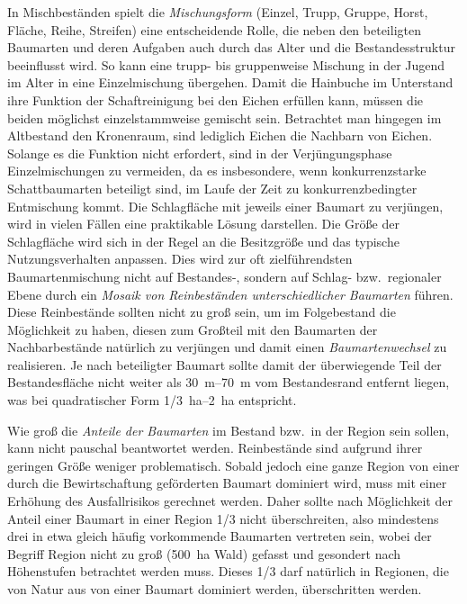 \documentclass[twocolumn, paper=a4, fontsize=10pt, bibliography=totoc, index=totoc]{scrartcl}
\begin{document}
In Mischbeständen spielt die \emph{Mischungsform} (Einzel, Trupp,
Gruppe, Horst, Fläche, Reihe, Streifen) eine entscheidende Rolle, die
neben den beteiligten Baumarten und deren Aufgaben auch durch das
Alter und die Bestandesstruktur beeinflusst wird. So kann eine trupp-
bis gruppenweise Mischung in der Jugend im Alter in eine
Einzelmischung übergehen. Damit die Hainbuche im Unterstand ihre
Funktion der Schaftreinigung bei den Eichen erfüllen kann, müssen
die beiden möglichst einzelstammweise gemischt sein. Betrachtet man
hingegen im Altbestand den Kronenraum, sind lediglich Eichen die
Nachbarn von Eichen. Solange es die Funktion nicht erfordert, sind in
der Verjüngungsphase Einzelmischungen zu vermeiden, da es insbesondere, wenn konkurrenzstarke Schattbaumarten beteiligt sind, im Laufe der Zeit
zu konkurrenzbedingter Entmischung kommt. Die Schlagfläche mit jeweils
einer Baumart zu verjüngen, wird in vielen Fällen eine praktikable
Lösung darstellen. Die Größe der Schlagfläche wird sich in der Regel
an die Besitzgröße und das typische Nutzungsverhalten anpassen. Dies
wird zur oft zielführendsten Baumartenmischung nicht auf Bestandes-,
sondern auf Schlag- bzw.\ regionaler Ebene durch ein \emph{Mosaik von Reinbeständen
unterschiedlicher Baumarten} führen. Diese Reinbestände sollten
nicht zu groß sein, um im Folgebestand die Möglichkeit zu haben,
diesen zum Großteil mit den Baumarten der Nachbarbestände natürlich zu
verjüngen und damit einen \emph{Baumartenwechsel} zu realisieren. Je
nach beteiligter Baumart sollte damit der überwiegende Teil der
Bestandesfläche nicht weiter als \qtyrange{30}{70}{\metre} vom Bestandesrand entfernt
liegen, was bei quadratischer Form \qtyrange[parse-numbers=false]{1/3}{2}{\hectare} entspricht.

Wie groß die \emph{Anteile der Baumarten} im Bestand bzw.\ in der
Region sein sollen, kann nicht pauschal beantwortet
werden. Reinbestände sind aufgrund ihrer geringen Größe weniger
problematisch. Sobald jedoch eine ganze Region von einer durch die
Bewirtschaftung geförderten Baumart dominiert wird, muss mit einer
Erhöhung des Ausfallrisikos gerechnet werden. Daher sollte nach
Möglichkeit der Anteil einer Baumart in einer Region 1/3 nicht
überschreiten, also mindestens drei in etwa gleich häufig vorkommende
Baumarten vertreten sein, wobei der Begriff Region nicht zu groß (\qty{500}{\hectare} Wald) gefasst und gesondert nach Höhenstufen betrachtet werden
muss. Dieses 1/3 darf natürlich in Regionen, die von Natur aus von
einer Baumart dominiert werden, überschritten werden.
\end{document}
